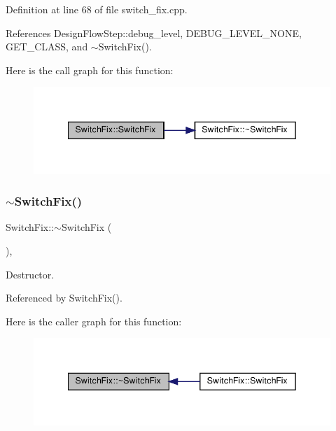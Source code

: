 Definition at line 68 of file switch\+\_\+fix.\+cpp.



References Design\+Flow\+Step\+::debug\+\_\+level, D\+E\+B\+U\+G\+\_\+\+L\+E\+V\+E\+L\+\_\+\+N\+O\+NE, G\+E\+T\+\_\+\+C\+L\+A\+SS, and $\sim$\+Switch\+Fix().

Here is the call graph for this function\+:
\nopagebreak
\begin{figure}[H]
\begin{center}
\leavevmode
\includegraphics[width=342pt]{de/def/classSwitchFix_a3acd195af1be04d4c834b5b542fcbf7d_cgraph}
\end{center}
\end{figure}
\mbox{\label{classSwitchFix_a84d2ac06dd53537c0bf17b369f2e65f2}} 
\subsubsection{\texorpdfstring{$\sim$\+Switch\+Fix()}{~SwitchFix()}}
{\footnotesize\ttfamily Switch\+Fix\+::$\sim$\+Switch\+Fix (\begin{DoxyParamCaption}{ }\end{DoxyParamCaption})\hspace{0.3cm}{\ttfamily [override]}, {\ttfamily [default]}}



Destructor. 



Referenced by Switch\+Fix().

Here is the caller graph for this function\+:
\nopagebreak
\begin{figure}[H]
\begin{center}
\leavevmode
\includegraphics[width=342pt]{de/def/classSwitchFix_a84d2ac06dd53537c0bf17b369f2e65f2_icgraph}
\end{center}
\end{figure}


